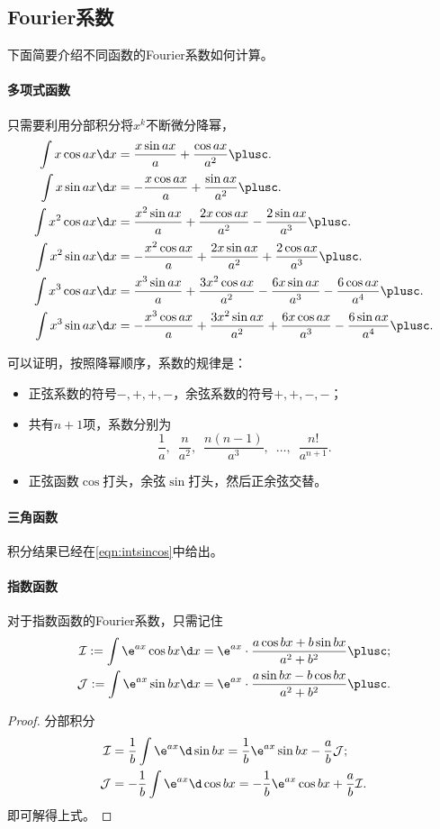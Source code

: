 \subsection{Fourier系数}

下面简要介绍不同函数的Fourier系数如何计算。

\paragraph{多项式函数}
只需要利用分部积分将$x^k$不断微分降幂，
\begin{align*}
	\int x\cos ax\d x&=\frac{x\sin ax}a+\frac{\cos ax}{a^2}\plusc.\\
	\int x\sin ax\d x&=-\frac{x\cos ax}a+\frac{\sin ax}{a^2}\plusc.\\
	\int x^2\cos ax\d x&=\frac{x^2\sin ax}a+\frac{2x\cos ax}{a^2}-\frac{2\sin ax}{a^3}\plusc.\\
	\int x^2\sin ax\d x&=-\frac{x^2\cos ax}a+\frac{2x\sin ax}{a^2}+\frac{2\cos ax}{a^3}\plusc.\\
	\int x^3\cos ax\d x&=\frac{x^3\sin ax}a+\frac{3x^2\cos ax}{a^2}-\frac{6x\sin ax}{a^3}-\frac{6\cos ax}{a^4}\plusc.\\
	\int x^3\sin ax\d x&=-\frac{x^3\cos ax}a+\frac{3x^2\sin ax}{a^2}+\frac{6x\cos ax}{a^3}-\frac{6\sin ax}{a^4}\plusc.
\end{align*}
\begin{remark}可以证明，按照降幂顺序，系数的规律是：
	\begin{itemize}
		\item 正弦系数的符号$-,+,+,-$，余弦系数的符号$+,+,-,-$；
		\item 共有$n+1$项，系数分别为
		\[
			\frac1a,\enspace\frac n{a^2},\enspace\frac{n(n-1)}{a^3},\enspace\ldots,\enspace\frac{n!}{a^{n+1}}.
		\]
		\item 正弦函数$\cos$打头，余弦$\sin$打头，然后正余弦交替。
	\end{itemize}
\end{remark}

\paragraph{三角函数}
积分结果已经在\eqref{eqn:intsincos}中给出。

\paragraph{指数函数}
对于指数函数的Fourier系数，只需记住
\begin{align*}
	\mathcal I:=\int\e^{ax}\cos bx\d x=\e^{ax}\cdot\frac{a\cos bx+b\sin bx}{a^2+b^2}\plusc;\\
	\mathcal J:=\int\e^{ax}\sin bx\d x=\e^{ax}\cdot\frac{a\sin bx-b\cos bx}{a^2+b^2}\plusc.
\end{align*}
\begin{proof}
	分部积分
	\begin{align*}
		\mathcal I&=\frac1b\int\e^{ax}\d\sin bx=\frac1b\e^{ax}\sin bx-\frac ab\mathcal J;\\
		\mathcal J&=-\frac1b\int\e^{ax}\d\cos bx=-\frac1b\e^{ax}\cos bx+\frac ab\mathcal I.
	\end{align*}
	即可解得上式。
\end{proof}

